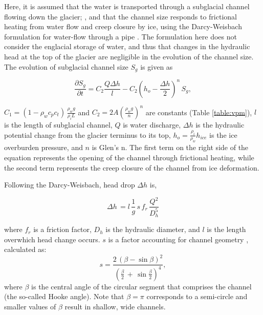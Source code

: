 \documentclass[11pt]{article}
\begin{document}
Here, it is assumed that the water is transported through a subglacial channel flowing down the glacier; \citep[Figure~\ref{fig:cartoon}; ][]{rothlisberger1972}, and that the channel  size responds to frictional heating from water flow and creep closure by ice, using the Darcy-Weisbach formulation for water-flow through a pipe  \citep[e.g.][]{rothlisberger1972,clarke2003}.
The formulation here does not consider the englacial storage of water, and thus that changes in the hydraulic head at the top of the glacier are negligible in the evolution of the channel size. 
The evolution of subglacial channel size $S_g$ is given as
\begin{linenomath*}
  \begin{equation}
    \label{eq:dS_dt}
    \frac{\partial S_g}{\partial t} = C_2 \frac{Q \Delta h}{l} - C_2 (h_{o}-\frac{\Delta h}{2})^n\,S_g,
  \end{equation}
\end{linenomath*}
\noindent $C_1= (1-\rho_wc_pc_t)\,\frac{\rho_wg}{\rho_iL}$ and $C_2=2A(\frac{\rho_wg}{n})^n$ are constants (Table \ref{table:vpm}), $l$ is the length of subglacial channel, $Q$ is water discharge, $\Delta h$ is the hydraulic potential change from the glacier terminus to its top, $h_{o}= \frac{\rho_i}{\rho_w} h_{ice}$ is the ice overburden pressure, and $n$ is Glen's n.
The first term on the right side of the equation represents the opening of the channel through frictional heating, while the second term represents the creep closure of the channel from ice deformation. 


Following the Darcy-Weisbach, head drop $\Delta h$ is,
\begin{linenomath*}
  \begin{equation}
    \label{eq:dh}
    \Delta h \,  = l \,\frac{1}{g}\,s\,f_r\,\frac{Q^2}{D_h^5}
  \end{equation}
\end{linenomath*}
\noindent where $f_r$ is a friction factor, $D_h$ is the hydraulic diameter, and $l$ is the length overwhich head change occurs. $s$ is a factor accounting for channel geometry \citep{hooke1990}, calculated as:
\begin{equation}
  \label{eq:Hf}
  s = \frac{2\,(\beta -\sin \beta)^2}{(\frac{\beta}{2}\,+\,\sin \frac{\beta}{2})^4},
\end{equation}
where $\beta$ is the central angle of the circular segment that comprises the channel (the so-called Hooke angle). Note that $\beta =\pi$ corresponds to a semi-circle and
smaller values of $\beta$ result in shallow, wide channels.
\end{document}
